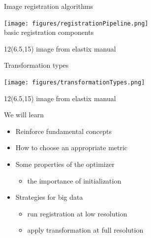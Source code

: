 \documentclass[aspectratio=169]{beamer}
\newcommand\citefoot[1]{
    \begin{textblock}{12}(6.5,15)
        {\color{HHMIGrayB} \tiny #1}
    \end{textblock}
}
\begin{document}
\begin{frame}{Image registration algorithms}

    \vspace{0.8em}
    \begin{center}
        \texttt{[image: figures/registrationPipeline.png]} \\
        basic registration components
    \end{center}

    \citefoot{image from elastix manual}
\end{frame}

\begin{frame}{Transformation types}

    \vspace{1.0em}
    \begin{center}
        \texttt{[image: figures/transformationTypes.png]} \\
    \end{center}

    \citefoot{image from elastix manual}
\end{frame}

\begin{frame}{We will learn}

    \begin{itemize}
        \item Reinforce fundamental concepts
        \item How to choose an appropriate metric
        \item Some properties of the optimizer
        \begin{itemize}
            \item the importance of initialization
        \end{itemize}
        \item Strategies for big data 
        \begin{itemize}
            \item run registration at low resolution
            \item apply transformation at full resolution
        \end{itemize}
    \end{itemize}

\end{frame}
\end{document}

